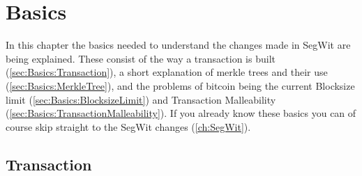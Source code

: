 
\section{Basics}
\label{ch:Basics}

In this chapter the basics needed to understand the changes made in SegWit are being explained. These consist of the way a transaction is built (\autoref{sec:Basics:Transaction}), a short explanation of merkle trees and their use (\autoref{sec:Basics:MerkleTree}), and the problems of bitcoin being the current Blocksize limit (\autoref{sec:Basics:BlocksizeLimit}) and Transaction Malleability (\autoref{sec:Basics:TransactionMalleability}). If you already know these basics you can of course skip straight to the SegWit changes (\autoref{ch:SegWit}).

\subsection{Transaction}
\label{sec:Basics:Transaction}

